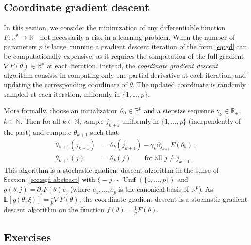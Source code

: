 \documentclass[11pt,reqno]{article}
\DeclareMathOperator{\Unif}{Unif}
\newcommand{\N}{\mathbb{N}}
\newcommand{\E}{\mathbb{E}}
\newcommand{\R}{\mathbb{R}}
\numberwithin{equation}{section}
\theoremstyle{plain}
\theoremstyle{definition}
\theoremstyle{remark}
\begin{document}
\subsection{Coordinate gradient descent}
\label{sec:cgd}

In this section, we consider the minimization of any differentiable function $F:\R^p \to \R$---not necessarily a risk in a learning problem. When the number of parameters $p$ is large, running a gradient descent iteration of the form \eqref{eq:gd} can be computationally expensive, as it requires the computation of the full gradient $\nabla F(\theta) \in \R^p$ at each iteration. Instead, the \emph{coordinate gradient descent} algorithm consists in computing only one partial derivative at each iteration, and updating the corresponding coordinate of $\theta$. The updated coordinate is randomly sampled at each iteration, uniformly in $\{1,\dots, p\}$. 

More formally, choose an initialization $\theta_0 \in \R^p$ and a stepsize sequence $\gamma_k \in \R_+$, $k \in \N$. Then for all $k \in \N$, sample $j_{k+1}$ uniformly in $\{1, \dots, p\}$ (independently of the past) and compute $\theta_{k+1}$ such that:
\begin{align*}
	\theta_{k+1}(j_{k+1}) &= \theta_k(j_{k+1}) - \gamma_k \partial_{j_{k+1}} F(\theta_k)  \, , \\
	\theta_{k+1}(j) &= \theta_k(j) \qquad \text{for all } j \neq j_{k+1} \, .
\end{align*}
This algorithm is a stochastic gradient descent algorithm in the sense of Section~\ref{sec:sgd-abstract} with $\xi = j \sim \Unif(\{1,\dots,p\})$ and $g(\theta,j) = \partial_j F(\theta) e_j$ (where $e_1, \dots, e_p$ is the canonical basis of $\R^p$). As $\E[g(\theta,\xi)] = \frac{1}{p} \nabla F(\theta)$, the coordinate gradient descent is a stochastic gradient descent algorithm on the function $f(\theta) = \frac{1}{p}F(\theta)$.




\subsection{Exercises}
\end{document}
